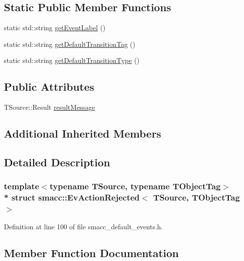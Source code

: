 \subsection*{Static Public Member Functions}
\begin{DoxyCompactItemize}
\item 
static std\+::string \hyperlink{structsmacc_1_1EvActionRejected_a51c9194f560d055a744e7c020af56838}{get\+Event\+Label} ()
\item 
static std\+::string \hyperlink{structsmacc_1_1EvActionRejected_aedef796db2cbdaed48a6f904c69e980b}{get\+Default\+Transition\+Tag} ()
\item 
static std\+::string \hyperlink{structsmacc_1_1EvActionRejected_a9ac258db0151f09b77d9ed65dbabfc31}{get\+Default\+Transition\+Type} ()
\end{DoxyCompactItemize}
\subsection*{Public Attributes}
\begin{DoxyCompactItemize}
\item 
T\+Source\+::\+Result \hyperlink{structsmacc_1_1EvActionRejected_a0236c082a2a408b48385f9aa0656af8c}{result\+Message}
\end{DoxyCompactItemize}
\subsection*{Additional Inherited Members}


\subsection{Detailed Description}
\subsubsection*{template$<$typename T\+Source, typename T\+Object\+Tag$>$\\*
struct smacc\+::\+Ev\+Action\+Rejected$<$ T\+Source, T\+Object\+Tag $>$}



Definition at line 100 of file smacc\+\_\+default\+\_\+events.\+h.



\subsection{Member Function Documentation}
